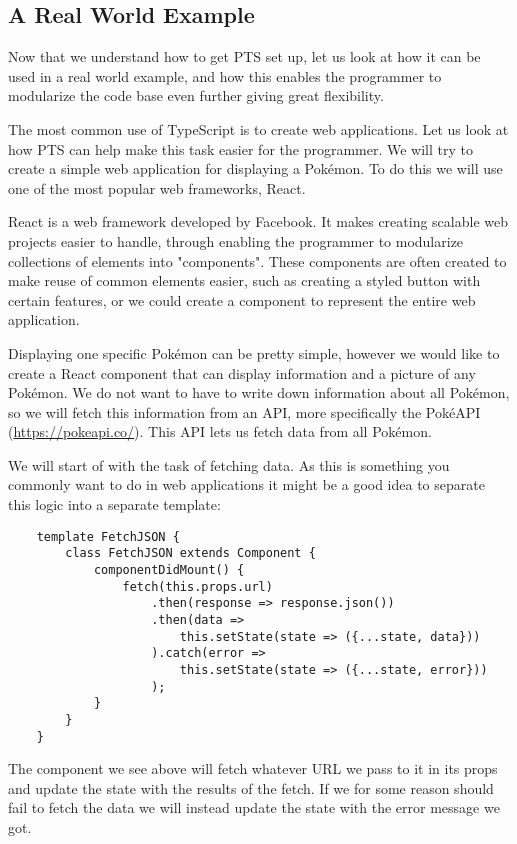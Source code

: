 \subsection{A Real World Example}\label{subsec:a-real-world-example}

Now that we understand how to get PTS set up, let us look at how it can be used in a real world example, and how this enables the programmer to modularize the code base even further giving great flexibility.

The most common use of TypeScript is to create web applications.
Let us look at how PTS can help make this task easier for the programmer.
We will try to create a simple web application for displaying a Pokémon.
To do this we will use one of the most popular web frameworks, React.

React is a web framework developed by Facebook.
It makes creating scalable web projects easier to handle, through enabling the programmer to modularize collections of elements into "components".
These components are often created to make reuse of common elements easier, such as creating a styled button with certain features, or we could create a component to represent the entire web application.

Displaying one specific Pokémon can be pretty simple, however we would like to create a React component that can display information and a picture of any Pokémon.
We do not want to have to write down information about all Pokémon, so we will fetch this information from an API, more specifically the PokéAPI (\url{https://pokeapi.co/}).
This API lets us fetch data from all Pokémon.

We will start of with the task of fetching data.
As this is something you commonly want to do in web applications it might be a good idea to separate this logic into a separate template:

\begin{verbatim}
    template FetchJSON {
        class FetchJSON extends Component {
            componentDidMount() {
                fetch(this.props.url)
                    .then(response => response.json())
                    .then(data =>
                        this.setState(state => ({...state, data}))
                    ).catch(error =>
                        this.setState(state => ({...state, error}))
                    );
            }
        }
    }
\end{verbatim}

The component we see above will fetch whatever URL we pass to it in its props and update the state with the results of the fetch.
If we for some reason should fail to fetch the data we will instead update the state with the error message we got.

